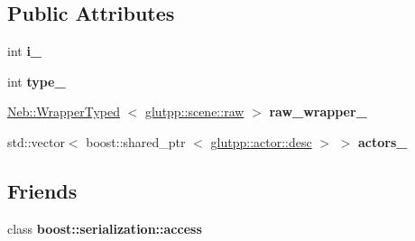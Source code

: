 \subsection*{\-Public \-Attributes}
\begin{DoxyCompactItemize}
\item 
\hypertarget{classglutpp_1_1scene_1_1desc_ac190024571d236c1afd7486e8a060551}{int {\bfseries i\-\_\-}}\label{classglutpp_1_1scene_1_1desc_ac190024571d236c1afd7486e8a060551}

\item 
\hypertarget{classglutpp_1_1scene_1_1desc_a29271bc477078880f196dc9db95b681a}{int {\bfseries type\-\_\-}}\label{classglutpp_1_1scene_1_1desc_a29271bc477078880f196dc9db95b681a}

\item 
\hypertarget{classglutpp_1_1scene_1_1desc_a7111c2115c45c44d416d47484b87b1c8}{\hyperlink{classNeb_1_1WrapperTyped}{\-Neb\-::\-Wrapper\-Typed}\*
$<$ \hyperlink{classglutpp_1_1scene_1_1raw}{glutpp\-::scene\-::raw} $>$ {\bfseries raw\-\_\-wrapper\-\_\-}}\label{classglutpp_1_1scene_1_1desc_a7111c2115c45c44d416d47484b87b1c8}

\item 
\hypertarget{classglutpp_1_1scene_1_1desc_a418d80ba5e56fd8dd564030b7fdb47a8}{std\-::vector$<$ boost\-::shared\-\_\-ptr\*
$<$ \hyperlink{classglutpp_1_1actor_1_1desc}{glutpp\-::actor\-::desc} $>$ $>$ {\bfseries actors\-\_\-}}\label{classglutpp_1_1scene_1_1desc_a418d80ba5e56fd8dd564030b7fdb47a8}

\end{DoxyCompactItemize}
\subsection*{\-Friends}
\begin{DoxyCompactItemize}
\item 
\hypertarget{classglutpp_1_1scene_1_1desc_ac98d07dd8f7b70e16ccb9a01abf56b9c}{class {\bfseries boost\-::serialization\-::access}}\label{classglutpp_1_1scene_1_1desc_ac98d07dd8f7b70e16ccb9a01abf56b9c}

\end{DoxyCompactItemize}


